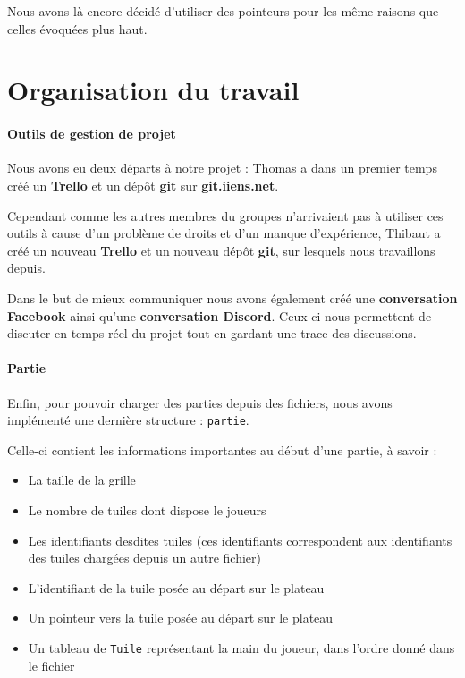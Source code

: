 \documentclass[12pt,a4paper]{article}
\begin{document}
Nous avons là encore décidé d'utiliser des pointeurs pour les même raisons que celles évoquées plus haut.

\pagebreak
\section{Organisation du travail}

\paragraph{Outils de gestion de projet\\}
	
Nous avons eu deux départs à notre projet : Thomas a dans un premier temps créé un \textbf{Trello} et un dépôt \textbf{git} sur \textbf{git.iiens.net}. 

Cependant comme les autres membres du groupes n'arrivaient pas à utiliser ces outils à cause d'un problème de droits et d'un manque d'expérience, Thibaut a créé un nouveau \textbf{Trello} et un nouveau dépôt \textbf{git}, sur lesquels nous travaillons depuis. 

Dans le but de mieux communiquer nous avons également créé une \textbf{conversation Facebook} ainsi qu'une \textbf{conversation Discord}. Ceux-ci nous permettent de discuter en temps réel du projet tout en gardant une trace des discussions.

\paragraph{Partie\\}

Enfin, pour pouvoir charger des parties depuis des fichiers, nous avons implémenté une dernière structure : \texttt{partie}.

Celle-ci contient les informations importantes au début d'une partie, à savoir :

\begin{itemize}
	\item La taille de la grille
    \item Le nombre de tuiles dont dispose le joueurs
    \item Les identifiants desdites tuiles (ces identifiants correspondent aux identifiants des tuiles chargées depuis un autre fichier)
    \item L'identifiant de la tuile posée au départ sur le plateau
    \item Un pointeur vers la tuile posée au départ sur le plateau
    \item Un tableau de \texttt{Tuile} représentant la main du joueur, dans l'ordre donné dans le fichier
\end{itemize}
\end{document}

